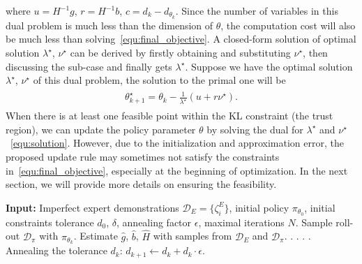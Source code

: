 \documentclass[letterpaper]{article} %
\begin{document}
where $u = H^{-1}g$, $r = H^{-1}b$, $c=d_k-d_{\theta_k}$. Since the number of variables in this dual problem is much less than the dimension of $\theta$, the computation cost will also be much less than solving~\eqref{equ:final_objective}. A closed-form solution of optimal solution $\lambda^\star$, $\nu^\star$ can be derived by firstly obtaining and substituting $\nu^\star$, then discussing the sub-case and finally gets $\lambda^\star$. Suppose we have the optimal solution $\lambda^\star$, $\nu^\star$ of this dual problem, the solution to the primal one will be
\begin{align}
\begin{split}\label{equ:solution}
    \theta_{k+1}^\star = \theta_k - \frac{1}{\lambda^\star}(u + r\nu^\star)\text{.}
\end{split}
\end{align}
When there is at least one feasible point within the KL constraint (the trust region), we can update the policy parameter $\theta$ by solving the dual for $\lambda^\star$ and $\nu^\star$~\eqref{equ:solution}. However, due to the initialization and approximation error, the proposed update rule may sometimes not satisfy the constraints in~\eqref{equ:final_objective}, especially at the beginning of optimization. In the next section, we will provide more details on ensuring the feasibility.

\begin{algorithm}[t!]
\caption{RLfD with a Soft Constraint}
\begin{algorithmic}\label{alg:main}
\STATE \textbf{Input:} Imperfect expert demonstrations $\mathcal{D}_E=\{\zeta_i^E\}$, initial policy $\pi_{\theta_0}$, initial constraints tolerance $d_0$, $\delta$, annealing factor $\epsilon$, maximal iterations $N$.
\STATE Sample roll-out $\mathcal{D}_{\pi}$ with $\pi_{\theta_k}$.
\STATE Estimate $\hat{g}$, $\hat{b}$, $\hat{H}$ with samples from $\mathcal{D}_E$ and $\mathcal{D}_\pi$.
.
.
.
\ELSE 
{}. 
\ENDIF \\
Annealing the tolerance $d_k$: $d_{k+1} \leftarrow d_k + d_k \cdot \epsilon$.
\ENDFOR\\
\end{algorithmic}
\end{algorithm}
\end{document}
